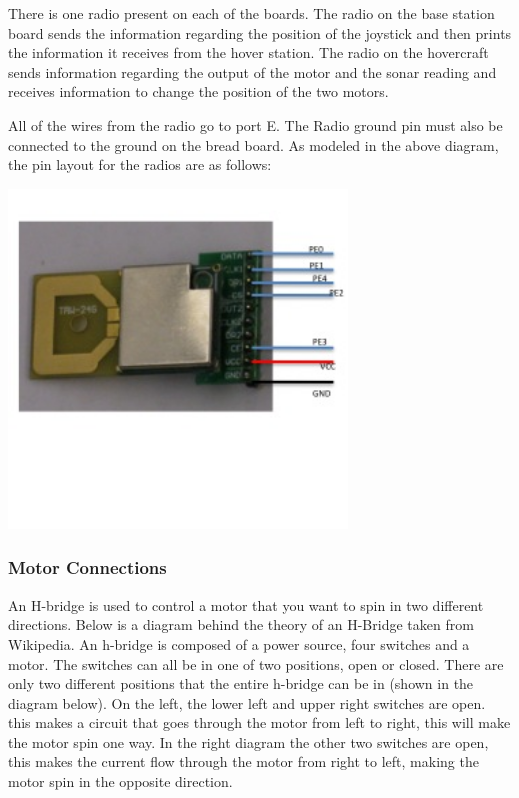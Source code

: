 There is one radio present on each of the boards. The radio on the base station board sends the information regarding the position of the joystick and then prints the information it receives from the hover station.  The radio on the hovercraft sends information regarding the output of the motor and the sonar reading and receives information to change the position of the two motors.

All of the wires from the radio go to port E. The Radio ground pin must also be connected to the ground on the bread board. As modeled in the above diagram, the pin layout for the radios are as follows:

  \begin{center}
    \includegraphics[width=90mm]{imageSources/radioConnect.png}
  \end{center}
  \label{radioConnect}


\subsubsection{Motor Connections}
An H-bridge is used to  control a motor that you want to spin in two different directions. Below is a diagram behind the theory of an H-Bridge taken from Wikipedia. An h-bridge is composed of a power source, four switches and a motor. The switches can all be in one of two positions, open or closed. There are only two different positions that the entire h-bridge can be in (shown in the diagram below). On the left, the lower left and upper right switches are open. this makes a circuit that goes through the motor from left to right, this will make the motor spin one way.  In the right diagram the other two switches are open, this makes the current flow through the motor from right to left, making the motor spin in the opposite direction.

